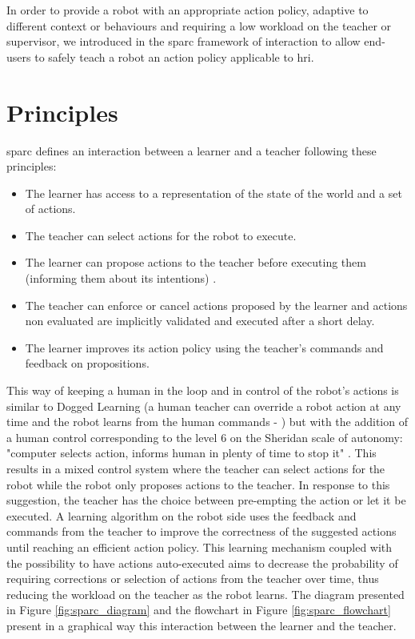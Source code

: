 In order to provide a robot with an appropriate action policy, adaptive to different context or behaviours and requiring a low workload on the teacher or supervisor, we introduced in \cite{senft2015sparc} the \acrfull{sparc} framework of interaction to allow end-users to safely teach a robot an action policy applicable to \gls{hri}.

\section{Principles} \label{sec:sparc_principles}

\gls{sparc} defines an interaction between a learner and a teacher following these principles:
\begin{itemize}
	\item The learner has access to a representation of the state of the world and a set of actions.
	\item The teacher can select actions for the robot to execute.
	\item The learner can propose actions to the teacher before executing them (informing them about its intentions) .
	\item The teacher can enforce or cancel actions proposed by the learner and actions non evaluated are implicitly validated and executed after a short delay.
	\item The learner improves its action policy using the teacher's commands and feedback on propositions.
\end{itemize} 

This way of keeping a human in the loop and in control of the robot's actions is similar to Dogged Learning (a human teacher can override a  robot action at any time and the robot learns from the human commands - \citealt{grollman2007dogged}) but with the addition of a human control corresponding to the level 6 on the Sheridan scale of autonomy: "computer selects action, informs human in plenty of time to stop it" \citep{sheridan1978human}. This results in a mixed control system where the teacher can select actions for the robot while the robot only proposes actions to the teacher. In response to this suggestion, the teacher has the choice between pre-empting the action or let it be executed. A learning algorithm on the robot side uses the feedback and commands from the teacher to improve the correctness of the suggested actions until reaching an efficient action policy. This learning mechanism coupled with the possibility to have actions auto-executed aims to decrease the probability of requiring corrections or selection of actions from the teacher over time, thus reducing the workload on the teacher as the robot learns. The diagram presented in Figure \ref{fig:sparc_diagram} and the flowchart in Figure \ref{fig:sparc_flowchart} present in a graphical way this interaction between the learner and the teacher.

